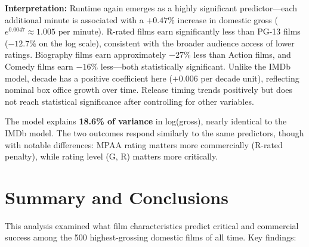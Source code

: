 \documentclass[11pt]{article}
\begin{document}
\textbf{Interpretation:} Runtime again emerges as a highly significant predictor---each additional minute is associated with a $+0.47\%$ increase in domestic gross ($e^{0.0047} \approx 1.005$ per minute). R-rated films earn significantly less than PG-13 films ($-12.7\%$ on the log scale), consistent with the broader audience access of lower ratings. Biography films earn approximately $-27\%$ less than Action films, and Comedy films earn $-16\%$ less---both statistically significant. Unlike the IMDb model, decade has a positive coefficient here ($+0.006$ per decade unit), reflecting nominal box office growth over time. Release timing trends positively but does not reach statistical significance after controlling for other variables.

The model explains \textbf{18.6\% of variance} in log(gross), nearly identical to the IMDb model. The two outcomes respond similarly to the same predictors, though with notable differences: MPAA rating matters more commercially (R-rated penalty), while rating level (G, R) matters more critically.

\section{Summary and Conclusions}

This analysis examined what film characteristics predict critical and commercial success among the 500 highest-grossing domestic films of all time. Key findings:
\end{document}

